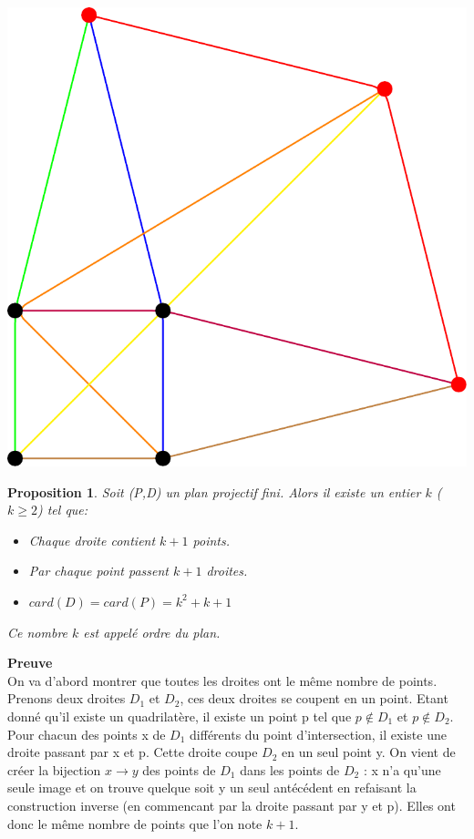\documentclass[a4paper]{article}
\newtheorem{Prop}[Def]{Proposition}
\begin{document}
\begin{center}
\includegraphics[scale=0.5]{test_tikz.pdf}
\end{center}
\vspace{2\baselineskip}
\begin{Prop}
  Soit (P,D) un plan projectif fini. Alors il existe un entier $k$ ($k \geq 2$) tel que:
  \begin{itemize}
  \item Chaque droite contient $k+1$ points.
  \item Par chaque point passent $k+1$ droites.
  \item $card(D) = card(P)=k^2+k+1$
    \end{itemize}
Ce nombre $k$ est appelé \emph{ordre} du plan.
\end{Prop}
\textbf{Preuve}\\
On va d'abord montrer que toutes les droites ont le même nombre de points. Prenons deux droites $D_1$ et $D_2$, ces deux droites se coupent en un point. Etant donné qu'il existe un quadrilatère, il existe un point p tel que $p \notin D_1$ et $p \notin D_2$. Pour chacun des points x de $D_1$ différents du point d'intersection, il existe une droite passant par x et p. Cette droite coupe $D_2$ en un seul point y. On vient de créer la bijection $x \longrightarrow y$ des points de $D_1$ dans les points de $D_2$ : x n'a qu'une seule image et on trouve quelque soit y un seul antécédent en refaisant la construction inverse (en commencant par la droite passant par y et p). Elles ont donc le même nombre de points que l'on note $k+1$.\smallskip\\
\end{document}
